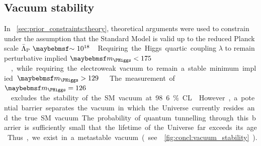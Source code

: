 \subsection{Vacuum stability}
\label{sec:implications:vacuum}

In \Section~\ref{sec:prior_constraints:theory}, theoretical arguments were used to 
constrain \mH under the assumption that the Standard Model is valid up to the reduced 
Planck scale \unit{$\bar{\Lambda}_{\text{P}}~\about~10^{18}$}{\GeV}. Requiring the Higgs 
quartic coupling $\lambda$ to remain perturbative implied \unit{$\mH < 175$}{\GeV}, while 
requiring the electroweak vacuum to remain a stable minimum implied 
\unit{$\mH > 129$}{\GeV} \cite{Ellis:2009}. 

The measurement of \unit{$\mH = 126$}{\GeV} excludes the stability of the SM vacuum at 
98.6\% CL \cite{Degrassi:vacuum}. However, a potential barrier separates the vacuum in 
which the Universe currently resides and the true SM vacuum. The probability of quantum 
tunnelling through this barrier is sufficiently small that the lifetime of the Universe 
far exceeds its age. Thus, we exist in a metastable vacuum (see 
\Figure~\ref{fig:concl:vacuum_stability}).

